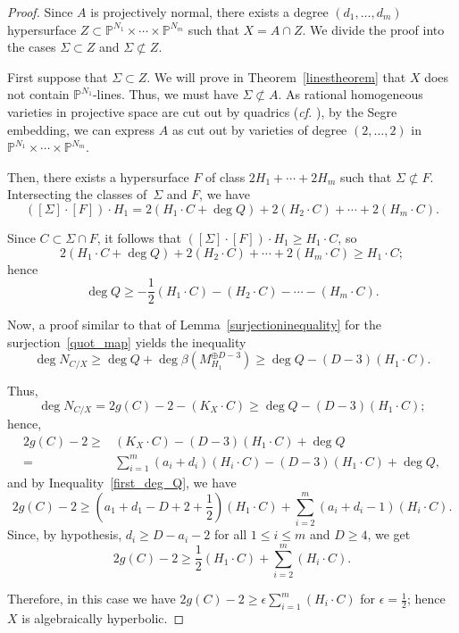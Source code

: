 \documentclass[10pt,a4paper]{article}
\numberwithin{equation}{section}
\theoremstyle{definition}
\theoremstyle{remark}
\renewcommand{\P}{\mathbb{P}}
\begin{document}
\begin{proof}
Since $A$ is projectively normal, there exists a degree $(d_1, \hdots , d_m)$ hypersurface $Z\subset \P^{N_1}\times \cdots \times \P^{N_m}$ such that $X = A\cap Z$. We divide the proof into the cases $\Sigma \subset Z$ and $\Sigma \not \subset Z$.

First suppose  that $\Sigma \subset Z$. We will prove in Theorem~\ref{linestheorem} that $X$ does not contain $\P^{N_1}$-lines. Thus, we must have $\Sigma \not \subset A$. As rational homogeneous varieties in projective space are cut out by quadrics (\textit{cf.} \cite[Theorem 3.11 and Remark 3.12]{Ram87}), by the Segre embedding, we can express $A$ as cut out by varieties of degree $(2,\hdots ,2)$ in $\P^{N_1}\times \cdots \times \P^{N_m}$.

Then, there exists a hypersurface $F$ of class $2H_1 + \cdots + 2H_m$ such that $\Sigma \not \subset F$. Intersecting the classes of~$\Sigma$ and $F$, we have
\[ ([\Sigma]\cdot [F])\cdot H_1 = 2(H_1\cdot C + \deg Q) + 2(H_2\cdot C) + \cdots + 2(H_m\cdot C). \]

Since $C\subset \Sigma\cap F$, it follows that $([\Sigma]\cdot [F])\cdot H_1\ge H_1\cdot C$, so
\[ 2(H_1\cdot C + \deg Q) + 2(H_2\cdot C) + \cdots + 2(H_m\cdot C)\ge H_1\cdot C; \]
hence
\begin{equation}\label{first_deg_Q}
    \deg Q\ge -\frac{1}{2}(H_1\cdot C) - (H_2\cdot C) - \cdots - (H_m\cdot C).
\end{equation}

Now, a proof similar to that of Lemma~\ref{surjectioninequality} for the surjection~\eqref{quot_map} yields the inequality
\[ \deg N_{C/X}\ge \deg Q + \deg \beta(M_{H_1}^{\oplus D-3})\ge \deg Q -(D-3)(H_1\cdot C). \]

Thus,
\[ \deg N_{C/X} = 2g(C) - 2 - (K_X\cdot C)\ge\deg Q -(D-3)(H_1\cdot C); \]
hence,
\begin{align*}
    2g(C)-2\ge & (K_X\cdot C) - (D-3)(H_1\cdot C) + \deg Q \\
    = & \sum_{i=1}^m(a_i+d_i)(H_i\cdot C) - (D-3)(H_1\cdot C) + \deg Q, 
\end{align*}
and by Inequality~\eqref{first_deg_Q}, we have
\[ 2g(C)-2\ge \left (a_1+d_1-D+2+\frac{1}{2}\right )(H_1\cdot C) + \sum_{i=2}^m(a_i+d_i-1)(H_i\cdot C). \]
Since, by hypothesis, $d_i\ge D-a_i-2$ for all $1\le i\le m$ and $D\ge 4$, we get
\[ 2g(C)-2\ge \frac{1}{2}(H_1\cdot C) + \sum_{i=2}^m(H_i\cdot C). \]

Therefore, in this case we have $2g(C)-2\ge \epsilon \sum_{i=1}^m(H_i\cdot C)$ for $\epsilon = \frac{1}{2}$; hence $X$ is algebraically hyperbolic.


\end{proof}
\end{document}
